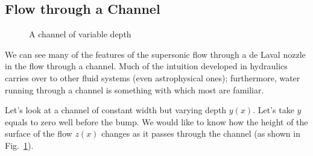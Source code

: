 \subsection{Flow through a Channel}
\label{sec:flow-through-channel}
{
\begin{figure}
\begin{center}
\caption{A channel of variable depth}
\label{fig:channel}
\end{center}
\end{figure}


We can see many of the features of the supersonic flow through a de
Laval nozzle in the flow through a channel.  Much of the intuition
developed in hydraulics carries over to other fluid systems (even
astrophysical ones); furthermore, water running through a channel is
something with which most are familiar.

Let's look at a channel of constant width but varying depth $y(x)$.
Let's take $y$ equals to zero well before the bump.  We would like to
know how the height of the surface of the flow $z(x)$ changes as it
passes through the channel (as shown in Fig.~\ref{fig:channel}).

}
